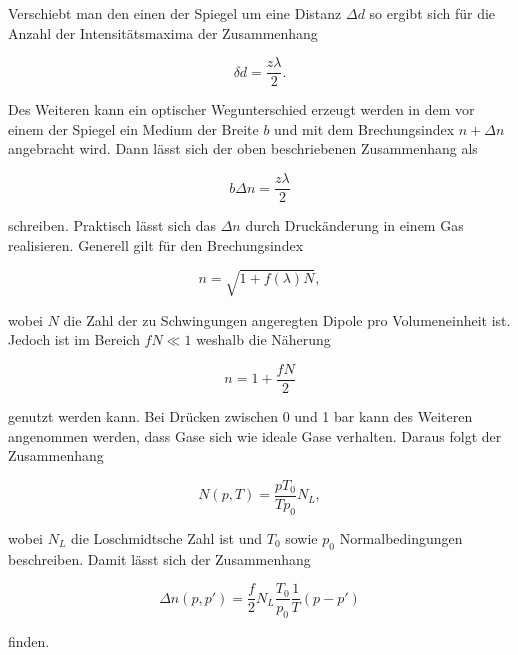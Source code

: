 Verschiebt man den einen der Spiegel um eine Distanz $\Delta d$ so ergibt sich für die Anzahl der Intensitätsmaxima der Zusammenhang

\begin{equation}
    \label{eqn:verschieben}
    \delta d = \frac{z \lambda}{2}.
\end{equation}

Des Weiteren kann ein optischer Wegunterschied erzeugt werden in dem vor einem der Spiegel ein Medium der Breite $b$ und mit dem Brechungsindex $n + \Delta n$ angebracht wird.
Dann lässt sich der oben beschriebenen Zusammenhang als

\begin{equation}
    \label{eqn:brech}
    b \Delta n = \frac{z \lambda}{2}
\end{equation}

schreiben.
Praktisch lässt sich das $\Delta n$ durch Druckänderung in einem Gas realisieren. Generell gilt für den Brechungsindex

\begin{equation}
    n = \sqrt{1 + f(\lambda) N},
\end{equation}

wobei $N$ die Zahl der zu Schwingungen angeregten Dipole pro Volumeneinheit ist. Jedoch ist im Bereich $fN \ll 1$ weshalb die Näherung

\begin{equation}
    n = 1 + \frac{fN}{2}
\end{equation}

genutzt werden kann. Bei Drücken zwischen 0 und 1 bar kann des Weiteren angenommen werden, dass Gase sich wie ideale Gase verhalten.
Daraus folgt der Zusammenhang

\begin{equation}
    N(p, T) = \frac{pT_0}{Tp_0}N_L,
\end{equation}

wobei $N_L$ die Loschmidtsche Zahl ist und $T_0$ sowie $p_0$ Normalbedingungen beschreiben.
Damit lässt sich der Zusammenhang

\begin{equation}
    \label{eqn:delta-n}
    \Delta n (p, p') = \frac{f}{2} N_L \frac{T_0}{p_0} \frac{1}{T}(p-p')
\end{equation}

finden.